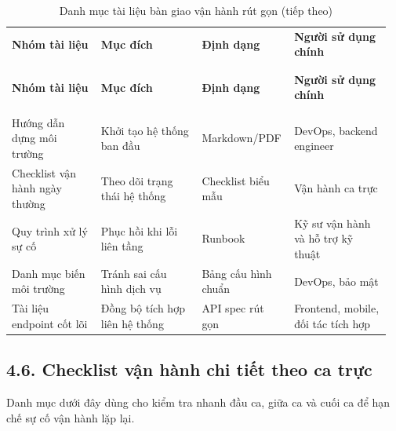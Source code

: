 \documentclass[a4paper]{extarticle}
\newcommand{\thesissettableid}[2]{%
  \renewcommand{\thetable}{#1}%
  \renewcommand{\theHtable}{#2}%
}
\begin{document}
{\thesissettableid{PL-4.1}{tab-condensed-app4-handover-docs}
\def\LTcaptype{table}
\begin{longtable}{|L{0.230\linewidth}|L{0.260\linewidth}|L{0.220\linewidth}|L{0.250\linewidth}|}
\caption{Danh mục tài liệu bàn giao vận hành rút gọn}\label{tab:condensed-app4-handover-docs}\\
\hline \textbf{Nhóm tài liệu} & \textbf{Mục đích} & \textbf{Định dạng} & \textbf{Người sử dụng chính} \\
\\\hline
\endfirsthead
\caption[]{Danh mục tài liệu bàn giao vận hành rút gọn (tiếp theo)}\\
\hline \textbf{Nhóm tài liệu} & \textbf{Mục đích} & \textbf{Định dạng} & \textbf{Người sử dụng chính} \\
\\\hline
\endhead
\\\hline
\endfoot
\endlastfoot
Hướng dẫn dựng môi trường & Khởi tạo hệ thống ban đầu & Markdown/PDF & DevOps, backend engineer \\\hline
Checklist vận hành ngày thường & Theo dõi trạng thái hệ thống & Checklist biểu mẫu & Vận hành ca trực \\\hline
Quy trình xử lý sự cố & Phục hồi khi lỗi liên tầng & Runbook & Kỹ sư vận hành và hỗ trợ kỹ thuật \\\hline
Danh mục biến môi trường & Tránh sai cấu hình dịch vụ & Bảng cấu hình chuẩn & DevOps, bảo mật \\\hline
Tài liệu endpoint cốt lõi & Đồng bộ tích hợp liên hệ thống & API spec rút gọn & Frontend, mobile, đối tác tích hợp \\\hline
\end{longtable}
}

\subsection{4.6. Checklist vận hành chi tiết theo ca trực}

Danh mục dưới đây dùng cho kiểm tra nhanh đầu ca, giữa ca và cuối ca để hạn chế sự cố vận hành lặp lại.
\end{document}
